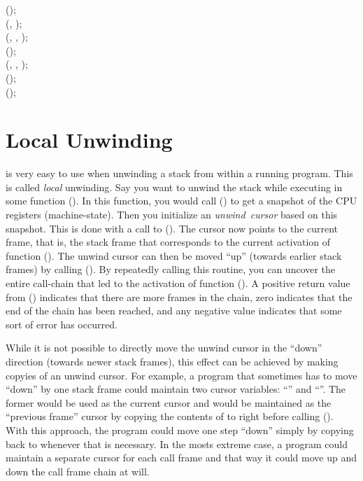 \documentclass{article}
\begin{document}
\noindent
{}();\\
\noindent
{} (, );\\
\noindent
{} (, , );\\
\noindent
{} ();\\
\noindent
{} (, , );\\

\noindent
{} ();\\
\noindent
{} ();\\

\section{Local Unwinding}

 is very easy to use when unwinding a stack from
within a running program.  This is called \emph{local} unwinding.  Say
you want to unwind the stack while executing in some function
().  In this function, you would call ()
to get a snapshot of the CPU registers (machine-state).  Then you
initialize an \emph{unwind~cursor} based on this snapshot.  This is
done with a call to ().  The cursor now points
to the current frame, that is, the stack frame that corresponds to the
current activation of function ().  The unwind cursor can then
be moved ``up'' (towards earlier stack frames) by calling
().  By repeatedly calling this routine, you can
uncover the entire call-chain that led to the activation of function
().  A positive return value from () indicates
that there are more frames in the chain, zero indicates that the end
of the chain has been reached, and any negative value indicates that
some sort of error has occurred.

While it is not possible to directly move the unwind cursor in the
``down'' direction (towards newer stack frames), this effect can be
achieved by making copyies of an unwind cursor.  For example, a
program that sometimes has to move ``down'' by one stack frame could
maintain two cursor variables: ``'' and ``''.  The
former would be used as the current cursor and  would be
maintained as the ``previous frame'' cursor by copying the contents of
 to  right before calling ().
With this approach, the program could move one step ``down'' simply by
copying back  to  whenever that is necessary.  In
the mosts extreme case, a program could maintain a separate cursor for
each call frame and that way it could move up and down the call frame
chain at will.
\end{document}
